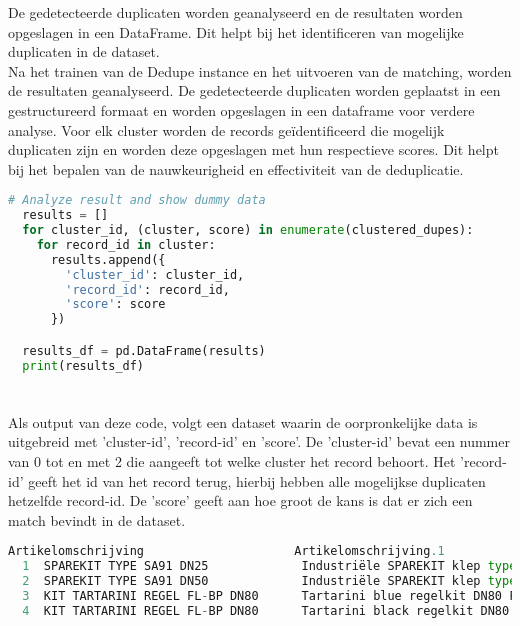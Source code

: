 De gedetecteerde duplicaten worden geanalyseerd en de resultaten worden opgeslagen in een DataFrame. Dit helpt bij het identificeren van mogelijke duplicaten in de dataset. 
\\Na het trainen van de Dedupe instance en het uitvoeren van de matching, worden de resultaten geanalyseerd. De gedetecteerde duplicaten worden geplaatst in een gestructureerd formaat en worden opgeslagen in een dataframe voor verdere analyse. Voor elk cluster worden de records geïdentificeerd  die mogelijk duplicaten zijn en worden deze opgeslagen met hun respectieve scores. Dit helpt bij het bepalen van de nauwkeurigheid en effectiviteit van de deduplicatie.
\begin{lstlisting}[language=Python, caption={Identificeren van mogelijke duplicaten in de dataset}]
  # Analyze result and show dummy data
  results = []
  for cluster_id, (cluster, score) in enumerate(clustered_dupes):
    for record_id in cluster:
      results.append({
        'cluster_id': cluster_id,
        'record_id': record_id,
        'score': score
      })

  results_df = pd.DataFrame(results)
  print(results_df)
\end{lstlisting}

\section{}%
\label{sec:analyseResultatenPOC}

Als output van deze code, volgt een dataset waarin de oorpronkelijke data is uitgebreid met 'cluster-id', 'record-id' en 'score'. De 'cluster-id' bevat een nummer van 0 tot en met 2 die aangeeft tot welke cluster het record behoort. Het 'record-id' geeft het id van het record terug, hierbij hebben alle mogelijkse duplicaten hetzelfde record-id. De 'score' geeft aan hoe groot de kans is dat er zich een match bevindt in de dataset.

\begin{lstlisting}[language=Python, caption={Output dedupe dataframe}]
     Artikelomschrijving		             Artikelomschrijving.1 	                      Voorts.gem.prijs	cluster_id	record_id		score
  1  SPAREKIT TYPE SA91 DN25             Industriële SPAREKIT klep type SA91	DN25    24,99	            1	          255	         0.50913
  2  SPAREKIT TYPE SA91 DN50             Industriële SPAREKIT klep type SA91 DN50	    30,00	            1	          255	         0.50913
  3  KIT TARTARINI REGEL FL-BP DN80      Tartarini blue regelkit DN80 FL-BP           589,00	          2	          726	         0.34925
  4  KIT TARTARINI REGEL FL-BP DN80      Tartarini black regelkit DN80 FL-BP          599,00	          2	          726	         0.34259
\end{lstlisting}

